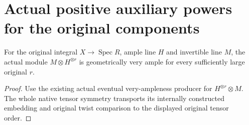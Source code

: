 \section{Actual positive auxiliary powers for the original components}

\begin{lemma}
\label{lem:kn-nadel-auxiliary-eventual-very-ample}
\leanok
{}
For the original integral $X\to\operatorname{Spec}R$, ample line $H$
and invertible line $M$, the actual module $M\otimes H^{\otimes r}$
is geometrically very ample for every sufficiently large original $r$.
\end{lemma}
\begin{proof}
Use the existing actual eventual very-ampleness producer for
$H^{\otimes r}\otimes M$. The whole native tensor symmetry transports
its internally constructed embedding and original twist comparison to
the displayed original tensor order.
\end{proof}

